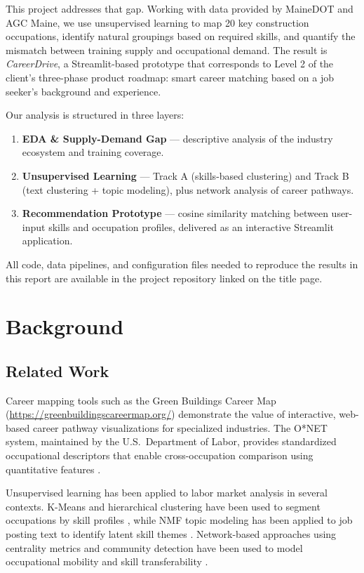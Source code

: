 \documentclass[12pt]{article}
\begin{document}
This project addresses that gap. Working with data provided by
MaineDOT and AGC Maine, we use unsupervised learning to map
20 key construction occupations, identify natural groupings based
on required skills, and quantify the mismatch between training
supply and occupational demand. The result is \textit{CareerDrive},
a Streamlit-based prototype that corresponds to Level 2 of the
client's three-phase product roadmap: smart career matching based
on a job seeker's background and experience.

Our analysis is structured in three layers:
\begin{enumerate}
    \item \textbf{EDA \& Supply-Demand Gap} --- descriptive
    analysis of the industry ecosystem and training coverage.
    \item \textbf{Unsupervised Learning} --- Track A
    (skills-based clustering) and Track B (text clustering +
    topic modeling), plus network analysis of career pathways.
    \item \textbf{Recommendation Prototype} --- cosine similarity
    matching between user-input skills and occupation profiles,
    delivered as an interactive Streamlit application.
\end{enumerate}

All code, data pipelines, and configuration files needed to
reproduce the results in this report are available in the
project repository linked on the title page.

\section{Background}

\subsection{Related Work}

Career mapping tools such as the Green Buildings Career Map
(\url{https://greenbuildingscareermap.org/}) demonstrate the
value of interactive, web-based career pathway visualizations
for specialized industries. The O*NET system, maintained by
the U.S.\ Department of Labor, provides standardized
occupational descriptors that enable cross-occupation comparison
using quantitative features \cite{onet}.

Unsupervised learning has been applied to labor market analysis
in several contexts. K-Means and hierarchical clustering have
been used to segment occupations by skill profiles
\cite{nedelkoska2018}, while NMF topic modeling has been applied
to job posting text to identify latent skill themes
\cite{decorte2021}. Network-based approaches using centrality
metrics and community detection have been used to model
occupational mobility and skill transferability
\cite{alabdulkareem2018}.
\end{document}
